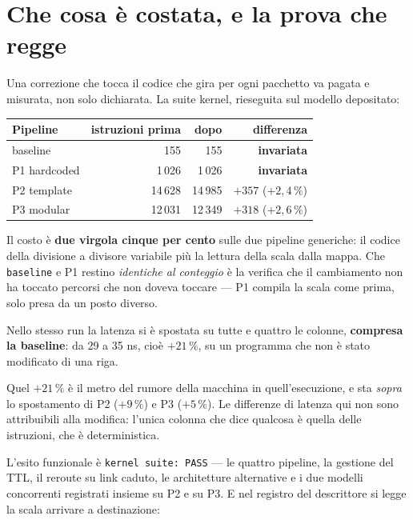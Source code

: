 \documentclass[11pt,a4paper,oneside]{report}
\begin{document}
\section{Che cosa è costata, e la prova che regge}

Una correzione che tocca il codice che gira per ogni pacchetto va pagata e
misurata, non solo dichiarata. La suite kernel, rieseguita sul modello
depositato:

\begin{center}
\small
\begin{tabular}{@{}lrrr@{}}
\toprule
\textbf{Pipeline} & \textbf{istruzioni prima} & \textbf{dopo} &
\textbf{differenza} \\
\midrule
baseline        &    155 &    155 & \textbf{invariata} \\
P1 hardcoded    & 1\,026 & 1\,026 & \textbf{invariata} \\
P2 template     & 14\,628 & 14\,985 & $+357$ \quad($+2{,}4\,\%$) \\
P3 modular      & 12\,031 & 12\,349 & $+318$ \quad($+2{,}6\,\%$) \\
\bottomrule
\end{tabular}
\end{center}

Il costo è \textbf{due virgola cinque per cento} sulle due pipeline generiche:
il codice della divisione a divisore variabile più la lettura della scala dalla
mappa. Che \texttt{baseline} e P1 restino \emph{identiche al conteggio} è la
verifica che il cambiamento non ha toccato percorsi che non doveva toccare ---
P1 compila la scala come prima, solo presa da un posto diverso.

\begin{prima}
Nello stesso run la latenza si è spostata su tutte e quattro le colonne,
\textbf{compresa la baseline}: da 29 a 35 ns, cioè $+21\,\%$, su un programma
che non è stato modificato di una riga.

Quel $+21\,\%$ è il metro del rumore della macchina in quell'esecuzione, e sta
\emph{sopra} lo spostamento di P2 ($+9\,\%$) e P3 ($+5\,\%$). Le differenze di
latenza qui non sono attribuibili alla modifica: l'unica colonna che dice
qualcosa è quella delle istruzioni, che è deterministica.
\end{prima}

L'esito funzionale è \texttt{kernel suite: PASS} --- le quattro pipeline, la
gestione del TTL, il reroute su link caduto, le architetture alternative e i
due modelli concorrenti registrati insieme su P2 e su P3. E nel registro del
descrittore si legge la scala arrivare a destinazione:
\end{document}
